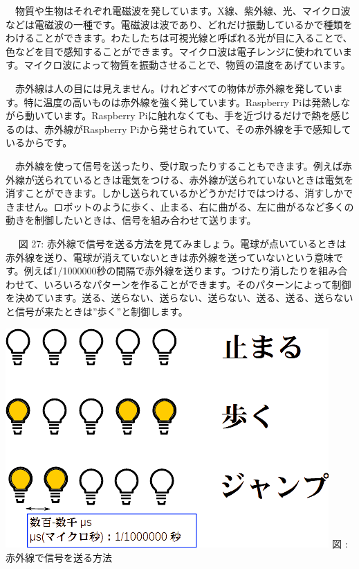 \documentclass[a4paper,dvipdfmx]{jarticle}
\newcounter{qwerty}
\renewcommand\theqwerty{\arabic{qwerty}}
\begin{document}
　物質や生物はそれぞれ電磁波を発しています。X線、紫外線、光、マイクロ波などは電磁波の一種です。電磁波は波であり、どれだけ振動しているかで種類をわけることができます。わたしたちは可視光線と呼ばれる光が目に入ることで、色などを目で感知することができます。マイクロ波は電子レンジに使われています。マイクロ波によって物質を振動させることで、物質の温度をあげています。

　赤外線は人の目には見えません。けれどすべての物体が赤外線を発しています。特に温度の高いものは赤外線を強く発しています。Raspberry
Piは発熱しながら動いています。Raspberry
Piに触れなくても、手を近づけるだけで熱を感じるのは、赤外線がRaspberry
Piから発せられていて、その赤外線を手で感知しているからです。

　赤外線を使って信号を送ったり、受け取ったりすることもできます。例えば赤外線が送られているときは電気をつける、赤外線が送られていないときは電気を消すことができます。しかし送られているかどうかだけではつける、消すしかできません。ロボットのように歩く、止まる、右に曲がる、左に曲がるなど多くの動きを制御したいときは、信号を組み合わせて送ります。

　 図 27:
赤外線で信号を送る方法を見てみましょう。電球が点いているときは赤外線を送り、電球が消えていないときは赤外線を送っていないという意味です。例えば1/1000000秒の間隔で赤外線を送ります。つけたり消したりを組み合わせて、いろいろなパターンを作ることができます。そのパターンによって制御を決めています。送る、送らない、送らない、送らない、送る、送る、送らないと信号が来たときは''歩く{}''と制御します。

\centering
\begin{minipage}{12.367cm}
{\upshape
 \includegraphics[width=12.367cm,height=8.373cm]{text05-img/text05-img036.png} \newline
図 {\theqwerty\label{seq:ref26}}:
赤外線で信号を送る方法}
\end{minipage}
\end{document}
